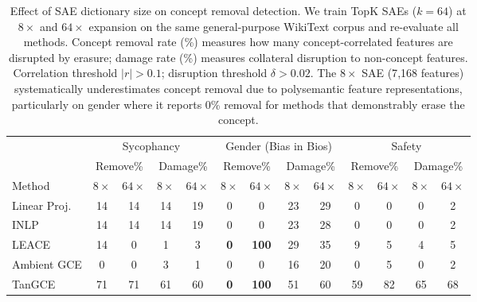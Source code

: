 \begin{table}[t]
\centering
\caption{Effect of SAE dictionary size on concept removal detection. We train TopK SAEs ($k{=}64$) at $8\times$ and $64\times$ expansion on the same general-purpose WikiText corpus and re-evaluate all methods. Concept removal rate (\%) measures how many concept-correlated features are disrupted by erasure; damage rate (\%) measures collateral disruption to non-concept features. Correlation threshold $|r|{>}0.1$; disruption threshold $\delta{>}0.02$. The $8\times$ SAE (7{,}168 features) systematically underestimates concept removal due to polysemantic feature representations, particularly on gender where it reports 0\% removal for methods that demonstrably erase the concept.}
\label{tab:sae_expansion}
\small
\setlength{\tabcolsep}{3pt}
\begin{tabular}{l|cc|cc|cc|cc|cc|cc}
\toprule
 & \multicolumn{4}{c|}{Sycophancy} & \multicolumn{4}{c|}{Gender (Bias in Bios)} & \multicolumn{4}{c}{Safety} \\
 & \multicolumn{2}{c|}{Remove\%} & \multicolumn{2}{c|}{Damage\%} & \multicolumn{2}{c|}{Remove\%} & \multicolumn{2}{c|}{Damage\%} & \multicolumn{2}{c|}{Remove\%} & \multicolumn{2}{c}{Damage\%} \\
Method & $8\times$ & $64\times$ & $8\times$ & $64\times$ & $8\times$ & $64\times$ & $8\times$ & $64\times$ & $8\times$ & $64\times$ & $8\times$ & $64\times$ \\
\midrule
Linear Proj. & 14 & 14 & 14 & 19 & 0 & 0 & 23 & 29 & 0 & 0 & 0 & 2 \\
INLP         & 14 & 14 & 14 & 19 & 0 & 0 & 23 & 28 & 0 & 0 & 0 & 2 \\
LEACE        & 14 & 0  & 1  & 3  & \textbf{0} & \textbf{100} & 29 & 35 & 9 & 5 & 4 & 5 \\
Ambient GCE  & 0  & 0  & 3  & 1  & 0 & 0 & 16 & 20 & 0 & 5 & 0 & 2 \\
TanGCE & 71 & 71 & 61 & 60 & \textbf{0} & \textbf{100} & 51 & 60 & 59 & 82 & 65 & 68 \\
\bottomrule
\end{tabular}
\end{table}
